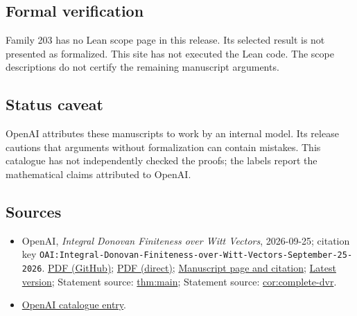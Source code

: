 \documentclass[11pt]{article}
\begin{document}
\subsection{Formal verification}
Family 203 has no Lean scope page in this release. Its selected result is not presented as formalized. This site has not executed the Lean code. The scope descriptions do not certify the remaining manuscript arguments.

\subsection{Status caveat}
OpenAI attributes these manuscripts to work by an internal model. Its release cautions that arguments without formalization can contain mistakes. This catalogue has not independently checked the proofs; the labels report the mathematical claims attributed to OpenAI.

\subsection{Sources}
\begin{itemize}
\item OpenAI, \emph{Integral Donovan Finiteness over Witt Vectors}, 2026-09-25; citation key \texttt{OAI:Integral-Donovan-Finiteness-over-Witt-Vectors-September-25-2026}. \href{https://github.com/openai/math/blob/adc7f1241b42e322a6451854ab7e4b4c146bf78a/preprints/Integral-Donovan-Finiteness-over-Witt-Vectors-September-25-2026/main.pdf}{PDF (GitHub)}; \href{https://github.com/openai/math/raw/adc7f1241b42e322a6451854ab7e4b4c146bf78a/preprints/Integral-Donovan-Finiteness-over-Witt-Vectors-September-25-2026/main.pdf}{PDF (direct)}; \href{https://github.com/openai/math/blob/adc7f1241b42e322a6451854ab7e4b4c146bf78a/preprints/Integral-Donovan-Finiteness-over-Witt-Vectors-September-25-2026/README.md}{Manuscript page and citation}; \href{https://github.com/openai/math/blob/main/preprints/Integral-Donovan-Finiteness-over-Witt-Vectors-September-25-2026/main.pdf}{Latest version}; Statement source: \href{https://github.com/openai/math/blob/adc7f1241b42e322a6451854ab7e4b4c146bf78a/preprints/Integral-Donovan-Finiteness-over-Witt-Vectors-September-25-2026/build/sections/01\_introduction.tex\#L19}{thm:main}; Statement source: \href{https://github.com/openai/math/blob/adc7f1241b42e322a6451854ab7e4b4c146bf78a/preprints/Integral-Donovan-Finiteness-over-Witt-Vectors-September-25-2026/build/sections/01\_introduction.tex\#L38}{cor:complete-dvr}.
\item \href{https://github.com/openai/math/blob/adc7f1241b42e322a6451854ab7e4b4c146bf78a/CONTENTS.md}{OpenAI catalogue entry}.
\end{itemize}
\end{document}
